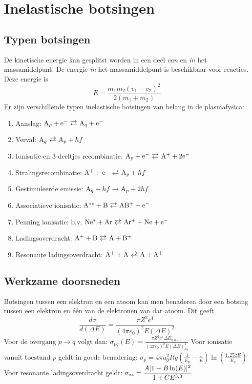 \documentclass[twoside]{report}
\begin{document}
\section{Inelastische botsingen}
\subsection{Typen botsingen}
De kinetische energie kan gesplitst worden in een deel {\it van} en {\it in}
het massamidelpunt. De energie {\it in} het massamiddelpunt is beschikbaar
voor reacties. Deze energie is
\[
E=\frac{m_1m_2(v_1-v_2)^2}{2(m_1+m_2)}
\]
Er zijn verschillende typen inelastische botsingen van belang in de plasmafysica:
\begin{enumerate}
\item Aanslag: ${\rm A}_p+{\rm e}^-\rlarrow{\rm A}_q+{\rm e}^-$
\item Verval: ${\rm A}_q\rlarrow{\rm A}_p+hf$
\item Ionisatie en 3-deeltjes recombinatie:
      ${\rm A}_p+{\rm e}^-\rlarrow{\rm A}^++2{\rm e}^-$
\item Stralingsrecombinatie: ${\rm A}^++{\rm e}^-\rlarrow{\rm A}_p+hf$
\item Gestimuleerde emissie: ${\rm A}_q+hf\rightarrow{\rm A}_p+2hf$
\item Associatieve ionisatie: $\rm A^{**}+B\rlarrow AB^++e^-$
\item Penning ionisatie: b.v. $\rm Ne^*+Ar\rlarrow Ar^++Ne+e^-$
\item Ladingsoverdracht: $\rm A^++B\rlarrow A+ B^+$
\item Resonante ladingsoverdracht: $\rm A^++A\rlarrow A+A^+$
\end{enumerate}

\subsection{Werkzame doorsneden}
Botsingen tussen een elektron en een atoom kan men benaderen door een
botsing tussen een elektron en \'e\'en van de elektronen van dat atoom. Dit
geeft
\[
\frac{d\sigma}{d(\Delta E)}=\frac{\pi Z^2 e^4}{(4\pi\varepsilon_0)^2E(\Delta E)^2}
\]
Voor de overgang $p\rightarrow q$ volgt dan:
$\displaystyle
\sigma_{pq}(E)=\frac{\pi Z^2e^4\Delta E_{q,q+1}}{(4\pi\varepsilon_0)^2E(\Delta E)_{pq}^2}
$
\npar
Voor ionisatie vanuit toestand $p$ geldt in goede benadering:
$\displaystyle
\sigma_p=4\pi a_0^2 Ry\left(\frac{1}{E_p}-\frac{1}{E}\right)\ln\left(\frac{1,25\beta E}{E_p}\right)
$
\npar
Voor resonante ladingsoverdracht geldt:
$\displaystyle\sigma_{\rm ex}=\frac{A[1-B\ln(E)]^2}{1+CE^{3,3}}$
\end{document}
